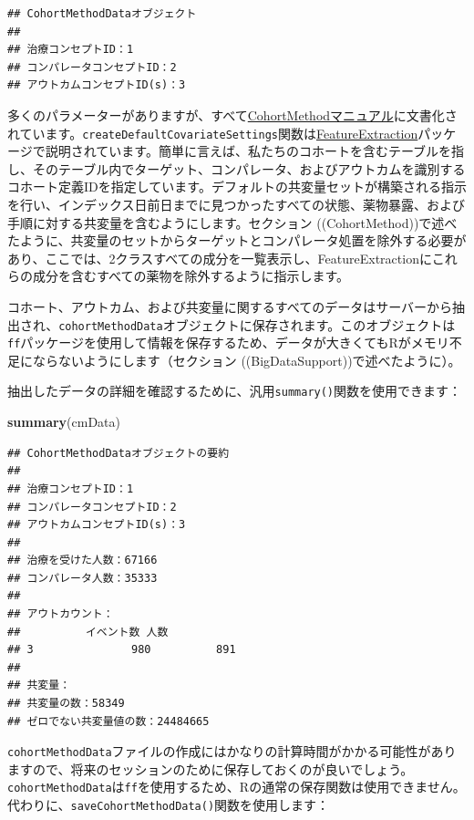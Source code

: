 \documentclass[
  11pt]{book}
\newenvironment{Shaded}{\begin{snugshade}}{\end{snugshade}}
\newcommand{\FunctionTok}[1]{\textcolor[rgb]{0.13,0.29,0.53}{\textbf{#1}}}
\newcommand{\NormalTok}[1]{#1}
\theoremstyle{definition}
\theoremstyle{definition}
\theoremstyle{definition}
\theoremstyle{definition}
\theoremstyle{remark}
\begin{document}
\begin{verbatim}
## CohortMethodDataオブジェクト
## 
## 治療コンセプトID：1
## コンパレータコンセプトID：2
## アウトカムコンセプトID(s)：3
\end{verbatim}

多くのパラメーターがありますが、すべて\href{https://ohdsi.github.io/CohortMethod/reference/}{CohortMethodマニュアル}に文書化されています。\texttt{createDefaultCovariateSettings}関数は\href{https://ohdsi.github.io/FeatureExtraction/}{FeatureExtraction}パッケージで説明されています。簡単に言えば、私たちのコホートを含むテーブルを指し、そのテーブル内でターゲット、コンパレータ、およびアウトカムを識別するコホート定義IDを指定しています。デフォルトの共変量セットが構築される指示を行い、インデックス日前日までに見つかったすべての状態、薬物暴露、および手順に対する共変量を含むようにします。セクション (\citet{ref}(CohortMethod))で述べたように、共変量のセットからターゲットとコンパレータ処置を除外する必要があり、ここでは、2クラスすべての成分を一覧表示し、FeatureExtractionにこれらの成分を含むすべての薬物を除外するように指示します。

コホート、アウトカム、および共変量に関するすべてのデータはサーバーから抽出され、\texttt{cohortMethodData}オブジェクトに保存されます。このオブジェクトは\texttt{ff}パッケージを使用して情報を保存するため、データが大きくてもRがメモリ不足にならないようにします（セクション (\citet{ref}(BigDataSupport))で述べたように）。

抽出したデータの詳細を確認するために、汎用\texttt{summary()}関数を使用できます：

\begin{Shaded}
\begin{Highlighting}[]
\FunctionTok{summary}\NormalTok{(cmData)}
\end{Highlighting}
\end{Shaded}

\begin{verbatim}
## CohortMethodDataオブジェクトの要約
## 
## 治療コンセプトID：1
## コンパレータコンセプトID：2
## アウトカムコンセプトID(s)：3
## 
## 治療を受けた人数：67166
## コンパレータ人数：35333
## 
## アウトカウント：
##          イベント数 人数
## 3               980          891
## 
## 共変量：
## 共変量の数：58349
## ゼロでない共変量値の数：24484665
\end{verbatim}

\texttt{cohortMethodData}ファイルの作成にはかなりの計算時間がかかる可能性がありますので、将来のセッションのために保存しておくのが良いでしょう。\texttt{cohortMethodData}は\texttt{ff}を使用するため、Rの通常の保存関数は使用できません。代わりに、\texttt{saveCohortMethodData()}関数を使用します：
\end{document}
